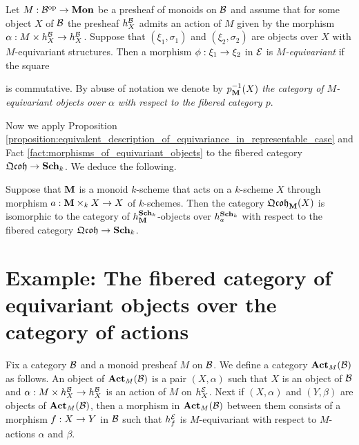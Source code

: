 \begin{definition}
Let $M:{\mathcal B}^{\mathrm{op}}\rightarrow \mathbf{Mon}$ be a presheaf of monoids on ${\mathcal B}$ and assume that for some object $X$ of ${\mathcal B}$ the presheaf $h^{{\mathcal B}}_X$ admits an action of $M$ given by the morphism $\alpha:M\times h^{{\mathcal B}}_X\rightarrow h^{{\mathcal B}}_X$. Suppose that $(\xi_1,\sigma_1)$ and $(\xi_2,\sigma_2)$ are objects over $X$ with $M$-equivariant structures. Then a morphism $\phi:\xi_1\rightarrow \xi_2$ in ${\mathcal E}$ is \textit{$M$-equivariant} if the square
\begin{center}
\end{center}
is commutative. By abuse of notation we denote by $p^{-1}_{\mathbf{M}}(X)$ \textit{the category of $M$-equivariant objects over $\alpha$ with respect to the fibered category $p$}.
\end{definition}
\noindent
Now we apply Proposition \ref{proposition:equivalent_description_of_equivariance_in_representable_case} and Fact \ref{fact:morphisms_of_equivariant_objects} to the fibered category $\mathfrak{Qcoh}\rightarrow \mathbf{Sch}_k$. We deduce the following.

\begin{corollary}\label{corollary:isomorphism_between_equivariant_quasi_coherent_sheaves_and_equivariant_objects_in_fibered_category_of_quasi_coherent_sheaves}
Suppose that $\mathbf{M}$ is a monoid $k$-scheme that acts on a $k$-scheme $X$ through morphism $a:\mathbf{M}\times_k X\rightarrow X$ of $k$-schemes. Then the category $\mathfrak{Qcoh}_{\mathbf{M}}(X)$ is isomorphic to the category of $h^{\mathbf{Sch}_k}_{\mathbf{M}}$-objects over $h^{\mathbf{Sch}_k}_a$ with respect to the fibered category $\mathfrak{Qcoh}\rightarrow \mathbf{Sch}_k$.
\end{corollary}

\section{Example: The fibered category of equivariant objects over the category of actions}\label{section:fibered_category_over_the_category_of_actions}
\noindent
Fix a category ${\mathcal B}$ and a monoid presheaf $M$ on ${\mathcal B}$. We define a category $\mathbf{Act}_{M}({\mathcal B})$ as follows. An object of $\mathbf{Act}_{M}({\mathcal B})$ is a pair $(X,\alpha)$ such that $X$ is an object of ${\mathcal B}$ and $\alpha:M\times h^{{\mathcal B}}_X\rightarrow h^{{\mathcal B}}_X$ is an action of $M$ on $h^{{\mathcal E}}_X$. Next if $(X,\alpha)$ and $(Y,\beta)$ are objects of $\mathbf{Act}_{M}({\mathcal B})$, then a morphism in $\mathbf{Act}_{M}({\mathcal B})$ between them consists of a morphism $f:X\rightarrow Y$ in ${\mathcal B}$ such that $h^{{\mathcal E}}_f$ is $M$-equivariant with respect to $M$-actions $\alpha$ and $\beta$.

